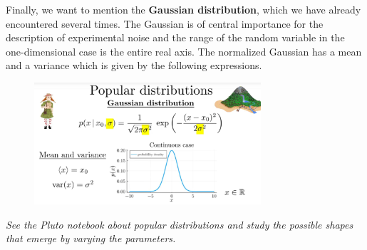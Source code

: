 \documentclass[12pt, a4paper]{scrartcl}
\begin{document}
Finally, we want to mention the  \textbf{Gaussian distribution}, which we have already
encountered several times. The Gaussian is of central importance for the
description of experimental noise and the range of the random variable in
the one-dimensional case is the entire real axis. The normalized Gaussian has a mean and a variance which is given by the following expressions.\\%
 \begin{figure}[H]
	\centering
	\includegraphics[width=0.75\textwidth]{8_13.png}
\end{figure}
\textit{See the Pluto notebook about popular distributions and study the possible
shapes that emerge by varying the parameters.}\\

\\
\end{document}

